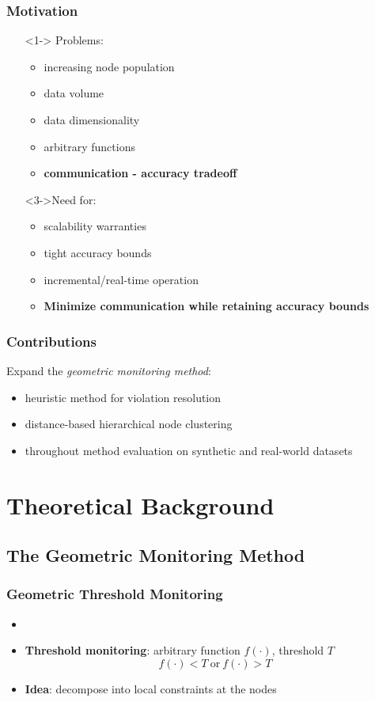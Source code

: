 \documentclass[hyperref={pdfpagelabels=false}]{beamer}
\begin{document}
\begin{frame} \frametitle{Motivation}
\begin{itemize}
\item[]<1-> Problems:
\begin{itemize}
	\item<1-> increasing node population
	\item<1-> data volume
	\item<1-> data dimensionality
	\item<1-> arbitrary functions
	\item<2-> \textbf{communication - accuracy tradeoff}
\end{itemize}
\item[]<3->Need for:
\begin{itemize}
	\item<3-> scalability warranties
	\item<3-> tight accuracy bounds
	\item<3-> incremental/real-time operation
	\item<4-> \textbf{Minimize communication while retaining accuracy bounds}
\end{itemize}
\end{itemize}
\end{frame}

\begin{frame} \frametitle{Contributions}
Expand the \emph{geometric monitoring method}:
\begin{itemize}
\item<1-> heuristic method for violation resolution
\item<2-> distance-based hierarchical node clustering
\item<3-> throughout method evaluation on synthetic and real-world datasets
\end{itemize}
\end{frame}

\section{Theoretical Background}
\begin{frame}
  \tableofcontents[currentsection]
 \end{frame}
\subsection{The Geometric Monitoring Method}
\begin{frame} \frametitle{Geometric Threshold Monitoring}
\begin{itemize}
\item {}
\item \textbf{Threshold monitoring}: arbitrary function $f(\cdot)$, threshold $T$\\
 $$f(\cdot)<T\ \text{or}\ f(\cdot)>T$$
\item \textbf{Idea}: decompose into local constraints at the nodes
\end{itemize}
\end{frame}
\end{document}
